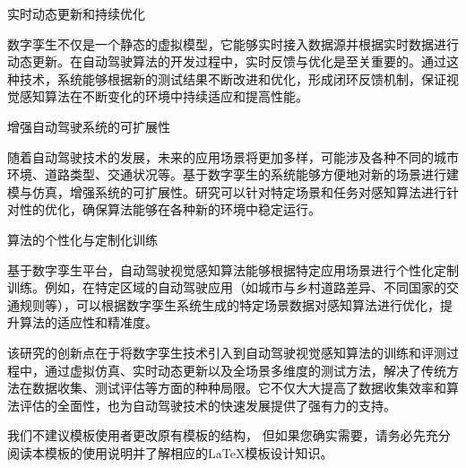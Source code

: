实时动态更新和持续优化

数字孪生不仅是一个静态的虚拟模型，它能够实时接入数据源并根据实时数据进行动态更新。在自动驾驶算法的开发过程中，实时反馈与优化是至关重要的。通过这种技术，系统能够根据新的测试结果不断改进和优化，形成闭环反馈机制，保证视觉感知算法在不断变化的环境中持续适应和提高性能。

增强自动驾驶系统的可扩展性

随着自动驾驶技术的发展，未来的应用场景将更加多样，可能涉及各种不同的城市环境、道路类型、交通状况等。基于数字孪生的系统能够方便地对新的场景进行建模与仿真，增强系统的可扩展性。研究可以针对特定场景和任务对感知算法进行针对性的优化，确保算法能够在各种新的环境中稳定运行。

算法的个性化与定制化训练

基于数字孪生平台，自动驾驶视觉感知算法能够根据特定应用场景进行个性化定制训练。例如，在特定区域的自动驾驶应用（如城市与乡村道路差异、不同国家的交通规则等），可以根据数字孪生系统生成的特定场景数据对感知算法进行优化，提升算法的适应性和精准度。

该研究的创新点在于将数字孪生技术引入到自动驾驶视觉感知算法的训练和评测过程中，通过虚拟仿真、实时动态更新以及全场景多维度的测试方法，解决了传统方法在数据收集、测试评估等方面的种种局限。它不仅大大提高了数据收集效率和算法评估的全面性，也为自动驾驶技术的快速发展提供了强有力的支持。

我们不建议模板使用者更改原有模板的结构，
但如果您确实需要，请务必先充分阅读本模板的使用说明并了解相应的\LaTeX{}模板设计知识。
